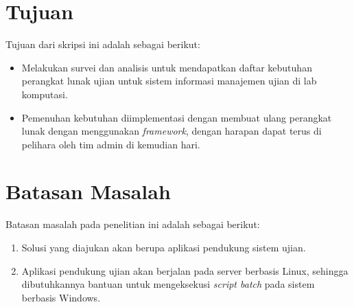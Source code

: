 \section{Tujuan}
\label{sec:tujuan}
Tujuan dari skripsi ini adalah sebagai berikut:
\begin{itemize}
    \item Melakukan survei dan analisis untuk mendapatkan daftar kebutuhan
    perangkat lunak ujian untuk sistem informasi manajemen ujian di lab
    komputasi.
    \item Pemenuhan kebutuhan diimplementasi dengan membuat ulang perangkat
    lunak dengan menggunakan \textit{framework}, dengan harapan dapat terus di
    pelihara oleh tim admin di kemudian hari.
\end{itemize}

\section{Batasan Masalah}
\label{sec:batasan}
Batasan masalah pada penelitian ini adalah sebagai berikut:
\begin{enumerate}
    \item Solusi yang diajukan akan berupa aplikasi pendukung sistem ujian.
  
    \item Aplikasi pendukung ujian akan berjalan pada server berbasis Linux,
    sehingga dibutuhkannya bantuan untuk mengeksekusi \textit{script batch} pada
    sistem berbasis Windows.
\end{enumerate}

